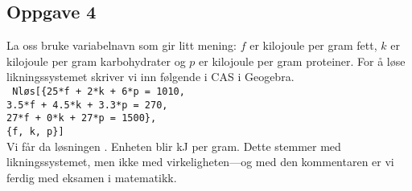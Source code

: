 \subsection*{Oppgave 4}
La oss bruke variabelnavn som gir litt mening: $f$ er kilojoule per gram fett, $k$ er kilojoule per gram karbohydrater og $p$ er kilojoule per gram proteiner. For å løse likningssystemet skriver vi inn følgende i CAS i Geogebra. \\
\texttt{
Nløs[\{25*f + 2*k + 6*p = 1010,\\ 
3.5*f + 4.5*k + 3.3*p = 270, \\
27*f + 0*k + 27*p = 1500\},\\
\{f, k, p\}]} \\
Vi får da løsningen .
Enheten blir kJ per gram.
Dette stemmer med likningssystemet, men ikke med virkeligheten---og med den kommentaren er vi ferdig med eksamen i matematikk.
	
	



